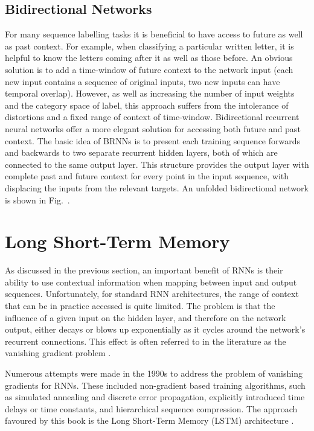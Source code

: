 \documentclass[runningheads,openany]{xhlPaper}
\begin{document}
\subsection{Bidirectional Networks}
For many sequence labelling tasks it is beneficial to have access to future as well as past context.
For example, when classifying a particular written letter, it is helpful to know the letters coming after it as well as those before.
An obvious solution is to add a time-window of future context to the network input (each new input contains a sequence of original inputs, two new inputs can have temporal overlap). However, as well as increasing the number of input weights and the category space of label, this approach suffers from the intolerance of distortions and a fixed range of context of time-window.
Bidirectional recurrent neural networks offer a more elegant solution for accessing both future and past context.
The basic idea of BRNNs is to present each training sequence forwards and backwards to two separate recurrent hidden layers, both of which are connected to the same output layer.
This structure provides the output layer with complete past and future context for every point in the input sequence, with displacing the inputs from the relevant targets.
An unfolded bidirectional network is shown in Fig.~.

\section{Long Short-Term Memory}
As discussed in the previous section, an important benefit of RNNs is their ability to use contextual information when mapping between input and output sequences.
Unfortunately, for standard RNN architectures, the range of context that can be in practice accessed is quite limited.
The problem is that the influence of a given input on the hidden layer, and therefore on the network output, either decays or blows up exponentially as it cycles around the network's recurrent connections.
This effect is often referred to in the literature as the vanishing gradient problem \cite{Hochreiter_LSTM_1997}.

Numerous attempts were made in the 1990s to address the problem of vanishing gradients for RNNs.
These included non-gradient based training algorithms, such as simulated annealing and discrete error propagation, explicitly introduced time delays or time constants, and hierarchical sequence compression.
The approach favoured by this book is the Long Short-Term Memory (LSTM) architecture \cite{Hochreiter_LSTM_1997}.
\end{document}
